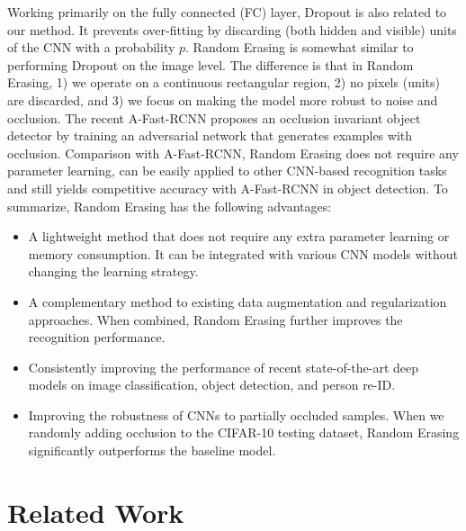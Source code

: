 \documentclass[10pt,twocolumn,letterpaper]{article}
\begin{document}
Working primarily on the fully connected (FC) layer, Dropout \cite{srivastava2014dropout} is also related to our method. It prevents over-fitting by discarding (both hidden and visible) units of the CNN with a probability $p$. Random Erasing is somewhat similar to performing Dropout on the image level. The difference is that in Random Erasing, 1) we operate on a continuous rectangular region,  2) no pixels (units) are discarded, and 3) we focus on making the model more robust to noise and occlusion. The recent A-Fast-RCNN \cite{A-fast-rcnn} proposes an occlusion invariant object detector by training an adversarial network that generates examples with occlusion. Comparison with A-Fast-RCNN, Random Erasing does not require any parameter learning, can be easily applied to other CNN-based recognition tasks and still yields competitive accuracy with A-Fast-RCNN in object detection.
To summarize, Random Erasing has the following advantages:
\begin{itemize}
\item A lightweight method that does not require any extra parameter learning or memory consumption. It can be integrated with various CNN models without changing the learning strategy.
\item A complementary method to existing data augmentation and regularization approaches. When combined, Random Erasing further improves the recognition performance.
\item Consistently improving the performance of recent state-of-the-art deep models on image classification, object detection, and person re-ID. 
\item Improving the robustness of CNNs to partially occluded samples. When we randomly adding occlusion to the CIFAR-10 testing dataset, Random Erasing significantly outperforms the baseline model.
\end{itemize}

\section{Related Work}

\end{document}
